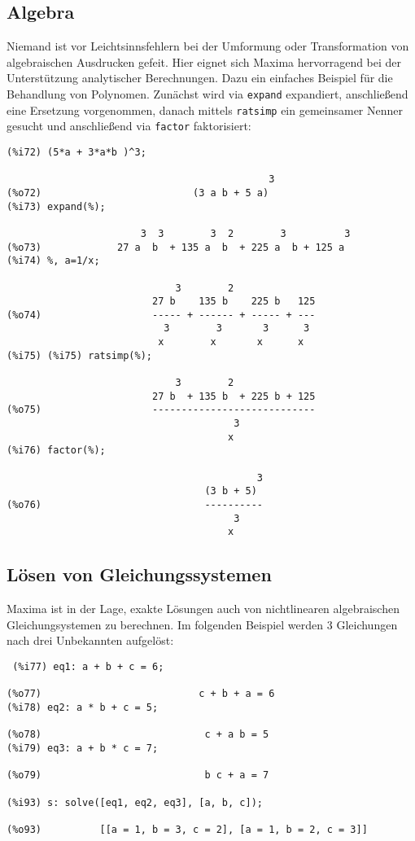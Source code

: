 \documentclass[12pt]{scrartcl}
\begin{document}
\subsection{Algebra}

Niemand ist vor Leichtsinnsfehlern bei der Umformung oder
Transformation von algebraischen Ausdrucken gefeit. Hier eignet sich
Maxima hervorragend  bei der Unterstützung analytischer Berechnungen.
Dazu ein einfaches Beispiel für die Behandlung von Polynomen. Zunächst
wird via \texttt{expand} expandiert, anschließend eine Ersetzung vorgenommen,
danach mittels \texttt{ratsimp} ein gemeinsamer Nenner gesucht und
anschließend via \texttt{factor} faktorisiert:

\begin{verbatim}
(%i72) (5*a + 3*a*b )^3;

                                             3
(%o72)                          (3 a b + 5 a)
(%i73) expand(%);

                       3  3        3  2        3          3
(%o73)             27 a  b  + 135 a  b  + 225 a  b + 125 a
(%i74) %, a=1/x;

                             3        2
                         27 b    135 b    225 b   125
(%o74)                   ----- + ------ + ----- + ---
                           3        3       3      3
                          x        x       x      x
(%i75) (%i75) ratsimp(%);

                             3        2
                         27 b  + 135 b  + 225 b + 125
(%o75)                   ----------------------------
                                       3
                                      x
(%i76) factor(%);

                                           3
                                  (3 b + 5)
(%o76)                            ----------
                                       3
                                      x
\end{verbatim}

\subsection{Lösen von Gleichungssystemen}

Maxima ist in der Lage, exakte Lösungen auch von nichtlinearen
algebraischen  Gleichungsystemen zu berechnen. Im folgenden Beispiel
werden 3  Gleichungen nach drei Unbekannten aufgelöst:

\begin{verbatim}
 (%i77) eq1: a + b + c = 6;

(%o77)                           c + b + a = 6
(%i78) eq2: a * b + c = 5;

(%o78)                            c + a b = 5
(%i79) eq3: a + b * c = 7;

(%o79)                            b c + a = 7

(%i93) s: solve([eq1, eq2, eq3], [a, b, c]);

(%o93)          [[a = 1, b = 3, c = 2], [a = 1, b = 2, c = 3]]
\end{verbatim}
\end{document}
